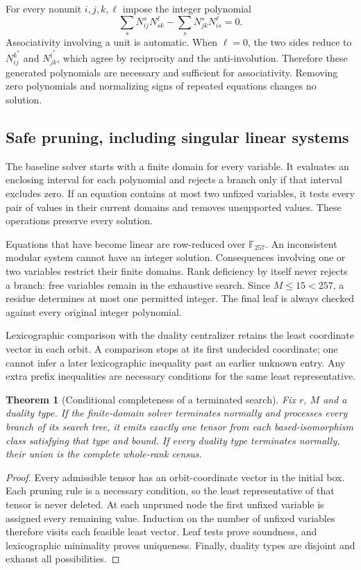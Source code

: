\documentclass[11pt,a4paper]{article}
\newtheorem{theorem}{Theorem}[section]\newtheorem{proposition}[theorem]{Proposition}
\theoremstyle{definition}\newtheorem{definition}[theorem]{Definition}\newtheorem{remark}[theorem]{Remark}
\begin{document}
For every nonunit $i,j,k,\ell$ impose the integer polynomial
\begin{equation}
 \sum_s N_{ij}^{s}N_{sk}^{\ell}-\sum_s N_{jk}^{s}N_{is}^{\ell}=0.
 \label{eq:associativity}
\end{equation}
Associativity involving a unit is automatic. When $\ell=0$, the two sides
reduce to $N_{ij}^{k^*}$ and $N_{jk}^{i^*}$, which agree by reciprocity and the
anti-involution. Therefore these generated polynomials are necessary and
sufficient for associativity. Removing zero polynomials and normalizing signs
of repeated equations changes no solution.

\subsection{Safe pruning, including singular linear systems}
The baseline solver starts with a finite domain for every variable. It evaluates
an enclosing interval for each polynomial and rejects a branch only if that
interval excludes zero. If an equation contains at most two unfixed variables,
it tests every pair of values in their current domains and removes unsupported
values. These operations preserve every solution.

Equations that have become linear are row-reduced over $\mathbb F_{257}$.
An inconsistent modular system cannot have an integer solution. Consequences
involving one or two variables restrict their finite domains. Rank deficiency
by itself never rejects a branch: free variables remain in the exhaustive
search. Since $M\leq15<257$, a residue determines at most one permitted integer.
The final leaf is always checked against every original integer polynomial.

Lexicographic comparison with the duality centralizer retains the least
coordinate vector in each orbit. A comparison stops at its first undecided
coordinate; one cannot infer a later lexicographic inequality past an earlier
unknown entry. Any extra prefix inequalities are necessary conditions for the
same least representative.

\begin{theorem}[Conditional completeness of a terminated search]
Fix $r$, $M$ and a duality type. If the finite-domain solver terminates normally
and processes every branch of its search tree, it emits exactly one tensor from
each based-isomorphism class satisfying that type and bound. If every duality
type terminates normally, their union is the complete whole-rank census.
\end{theorem}
\begin{proof}
Every admissible tensor has an orbit-coordinate vector in the initial box.
Each pruning rule is a necessary condition, so the least representative of
that tensor is never deleted. At each unpruned node the first unfixed variable
is assigned every remaining value. Induction on the number of unfixed variables
therefore visits each feasible least vector. Leaf tests prove soundness, and
lexicographic minimality proves uniqueness. Finally, duality types are disjoint
and exhaust all possibilities.
\end{proof}
\end{document}
